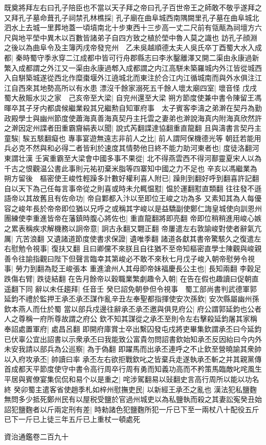 既奠將拜左右曰孔子陪臣也不當以天子拜之帝曰孔子百世帝王之師敢不敬乎遂拜之又拜孔子墓命葺孔子祠禁孔林樵採|{
	孔子廟在曲阜城西南隅闕里孔子墓在曲阜城北泗水上去城一里葬地蓋一頃墳南北十步東西十三步高一丈二尺前有瓴甋為祠壇方六尺與地平塋中異木以百數皆諸弟子自四方致之植於塋中魯人莫之識也}
訪孔子顔淵之後以為曲阜令及主簿丙戌帝發兖州　乙未吳越順德太夫人吳氏卒丁酉蜀大水入成都|{
	秦時蜀守季氷穿二江成都中皆可行舟郡縣志曰李氷鑿離澤又開二渠由永康過新繁入成都謂之外江又一渠由永康過郫入成都謂之内江高駢未築羅城内外江皆從城西入自駢築城遂從西北作糜棗堰外江遶城北而東注於合江内江循城南而與外水俱注江江自西來其地勢高所以有水患}
漂沒千餘家溺死五千餘人壞太廟四室|{
	壞音怪}
戊戌蜀大赦賑水災之家　己亥帝至大梁|{
	自兖州還至大梁}
朔方節度使兼中書令陳留王馮暉卒其子牙内都虞候繼業殺其兄繼勲自知軍府事　太子賓客李濤之弟澣在契丹為勤政殿學士與幽州節度使蕭海真善海真契丹主托雲之妻弟也澣說海真内附海真欣然許之澣因定州諜者田重霸齎絹表以聞|{
	說式芮翻諜達協翻重直龍翻}
且與濤書言契丹主童騃|{
	騃五駭翻癡也}
專事宴遊無遠志非前人之比|{
	前人謂阿保機德光等}
朝廷若能用兵必克不然與和必得二者皆利於速度其情勢他日終不能力助河東者也|{
	度徒洛翻河東謂壮漢}
壬寅重霸至大梁會中國多事不果從|{
	北不得燕雲西不得河鄯靈夏宋人以為千古之恨觀温公書此事則元祐初棄米脂等四寨知中國之力不足也}
辛亥以馮繼業為朔方留後　樞密使王峻性輕躁多計數好權利喜人附已|{
	躁則到翻好呼到翻喜許記翻}
自以天下為己任每言事帝從之則喜或時未允輒愠懟|{
	愠於運翻懟直類翻}
往往發不遜語帝以其故舊且有佐命功|{
	帝自鄴都入汴以至即位王峻之功為多}
又素知其為人每優容之峻年長於帝帝即位猶以兄呼之或稱其字峻以是益驕副使鄭仁誨皇城使向訓恩州團練使李重進皆帝在藩鎮時腹心將佐也|{
	重直龍翻將即亮翻}
帝即位稍稍進用峻心嫉之累表稱疾求解機務以詗帝意|{
	詗古永翻又翾正翻}
帝屢遣左右敦諭峻對使者辭氣亢厲|{
	亢苦浪翻}
又遺諸道節度使書求保證|{
	遺唯季翻}
諸道各獻其書帝驚駭久之復遣左右慰勉令視事|{
	復扶又翻}
且曰卿儻不來朕且自往猶不至帝知樞密直學士陳觀與峻親善令往諭指觀曰陛下但聲言臨幸其第峻必不敢不來秋七月戊子峻入朝帝慰勞令視事|{
	勞力到翻為貶王峻張本}
重進滄州人其母即帝妹福慶長公主也|{
	長知兩翻}
李穀足跌傷右臂|{
	跌徒結翻}
在告月餘帝以穀職業繁劇趣令入朝|{
	在告在假也趣讀曰促朝直遥翻下同}
辭以未任趨拜|{
	任音壬}
癸巳詔免朝參但令視事　蜀工部尚書判武德軍郭延鈞不禮於監押王承丕承丕謀作亂辛丑左奉聖都指揮使安次孫欽|{
	安次縣屬幽州孫欽本燕人而仕於蜀}
當以部兵戍邊往辭承丕承丕邀與俱見府公|{
	府公謂郭延鈞也公者人之尊稱一府所尊故謂之府公}
欽不知其謀從之承丕至則令左右擊殺延鈞屠其家稱奉詔處置軍府|{
	處昌呂翻}
即開府庫賞士卒出繫囚發屯戍將吏畢集欽謂承丕曰今延鈞已伏辜公宜出詔書以示衆承丕曰我能致公富貴勿問詔書欽始知承丕反因紿曰今内外未安我請以部兵為公巡察|{
	為于偽翻}
即躍馬而出承丕連呼之不止欽至營曉諭其衆帥以入府攻承丕|{
	帥讀曰率}
承丕左右欲拒戰欽叱之皆棄兵走遂執承丕斬之并其親黨傳首成都天平節度使守中書令高行周卒行周有勇而知義功高而不矜策馬臨敵叱咤風生平居與賓僚宴集侃侃和易个以是重之|{
	咤涉駕翻易以䜴翻史言高行周所以能以功名終}
癸卯蜀主遣客省使趙季札如梓州慰撫吏民|{
	以新經王承丕之亂也}
漢法犯私鹽麴無問多少抵死鄭州民有以屋税受鹽於官過州城吏以為私鹽執而殺之其妻訟寃癸丑始詔犯鹽麴者以斤兩定刑有差|{
	時勑諸色犯鹽麴所犯一斤已下至一兩杖八十配役五斤已下一斤已上徒三年五斤已上重杖一頓處死}


資治通鑑卷二百九十
